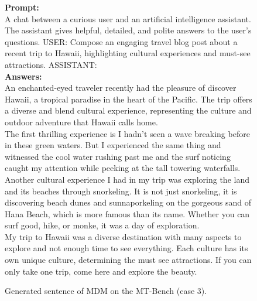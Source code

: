 \begin{figure}[t!]
    {\selectfont
    \textbf{Prompt:} \\
    A chat between a curious user and an artificial intelligence assistant. The assistant gives helpful, detailed, and polite answers to the user's questions. USER: Compose an engaging travel blog post about a recent trip to Hawaii, highlighting cultural experiences and must-see attractions. ASSISTANT: \\
    \textbf{Answers:}\\
    An enchanted-eyed traveler recently had the pleasure of discover Hawaii, a tropical paradise in the heart of the Pacific. The trip offers a diverse and blend cultural experience, representing the culture and outdoor adventure that Hawaii calls home. \\
    The first thrilling experience is I hadn't seen a wave breaking before in these green waters. But I experienced the same thing and witnessed the cool water rushing past me and the surf noticing caught my attention while peeking at the tall towering waterfalls. \\
    Another cultural experience I had in my trip was exploring the land and its beaches through snorkeling. It is not just snorkeling, it is discovering beach dunes and sunnaporkeling on the gorgeous sand of Hana Beach, which is more famous than its name. Whether you can surf good, hike, or monke, it was a day of exploration. \\
    My trip to Hawaii was a diverse destination with many aspects to explore and not enough time to see everything. Each culture has its own unique culture, determining the must see attractions. If you can only take one trip, come here and explore the beauty.
}
\caption{Generated sentence of MDM on the MT-Bench (case 3).}
\label{fig:app_generative_samples_3}
\end{figure}


